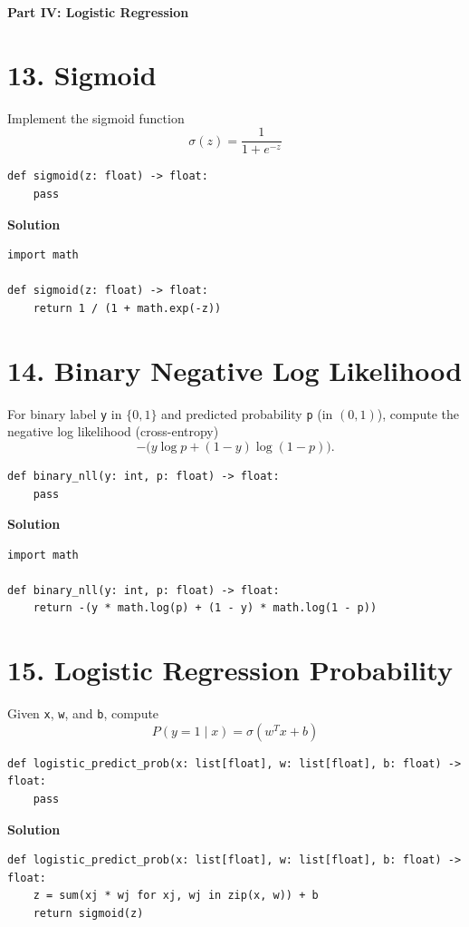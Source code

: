 \documentclass[11pt]{article}
\begin{document}
\vspace{0.75em}
\noindent\textbf{\large Part IV: Logistic Regression}
\vspace{0.5em}

\section*{13. Sigmoid}
Implement the sigmoid function
\[
\sigma(z) = \frac{1}{1 + e^{-z}}
\]

\begin{lstlisting}
def sigmoid(z: float) -> float:
    pass
\end{lstlisting}

\medskip
\noindent\textbf{Solution}
\begin{lstlisting}
import math

def sigmoid(z: float) -> float:
    return 1 / (1 + math.exp(-z))
\end{lstlisting}

\section*{14. Binary Negative Log Likelihood}
For binary label \texttt{y} in \(\{0, 1\}\) and predicted probability \texttt{p} (in \((0, 1)\)), compute the negative log likelihood (cross-entropy)
\[
-\bigl(y \log p + (1-y)\log(1-p)\bigr).
\]

\begin{lstlisting}
def binary_nll(y: int, p: float) -> float:
    pass
\end{lstlisting}

\medskip
\noindent\textbf{Solution}
\begin{lstlisting}
import math

def binary_nll(y: int, p: float) -> float:
    return -(y * math.log(p) + (1 - y) * math.log(1 - p))
\end{lstlisting}

\section*{15. Logistic Regression Probability}
Given \texttt{x}, \texttt{w}, and \texttt{b}, compute
\[
P(y=1 \mid x) = \sigma(w^T x + b)
\]

\begin{lstlisting}
def logistic_predict_prob(x: list[float], w: list[float], b: float) -> float:
    pass
\end{lstlisting}

\medskip
\noindent\textbf{Solution}
\begin{lstlisting}
def logistic_predict_prob(x: list[float], w: list[float], b: float) -> float:
    z = sum(xj * wj for xj, wj in zip(x, w)) + b
    return sigmoid(z)
\end{lstlisting}
\end{document}
